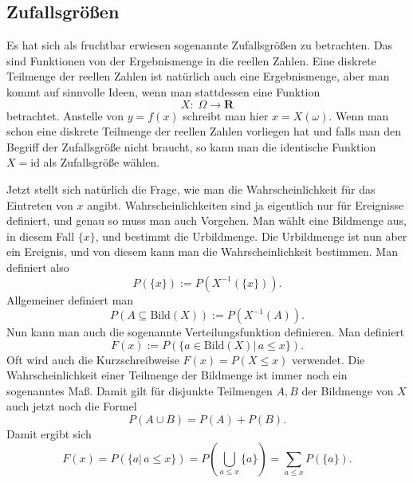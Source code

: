 \documentclass[a4paper,11pt,fleqn,twocolumn,twoside]{scrartcl}
\numberwithin{equation}{section}
\begin{document}
\subsection{Zufallsgrößen}

Es hat sich als fruchtbar erwiesen sogenannte Zufallsgrößen zu
betrachten. Das sind Funktionen von der Ergebnismenge in die reellen
Zahlen. Eine diskrete Teilmenge der reellen Zahlen ist natürlich auch
eine Ergebnismenge, aber man kommt auf sinnvolle Ideen, wenn man
stattdessen eine Funktion
\begin{equation}
X{:}\;\Omega\rightarrow\mathbf R
\end{equation}
betrachtet. Anstelle von $y=f(x)$ schreibt man hier $x=X(\omega)$.
Wenn man schon eine diskrete Teilmenge der reellen Zahlen vorliegen
hat und falls man den Begriff der Zufallsgröße nicht braucht, so kann
man die identische Funktion $X=\mathrm{id}$ als Zufallsgröße wählen.

Jetzt stellt sich natürlich die Frage, wie man die
Wahrscheinlichkeit für das Eintreten von $x$ angibt.
Wahrscheinlichkeiten sind ja eigentlich nur für Ereignisse definiert,
und genau so muss man auch Vorgehen. Man wählt eine Bildmenge aus,
in diesem Fall $\{x\}$, und bestimmt die Urbildmenge.
Die Urbildmenge ist nun aber ein Ereignis, und von diesem kann man
die Wahrscheinlichkeit bestimmen. Man definiert also
\begin{equation}
P(\{x\}) := P(X^{-1}(\{x\})).
\end{equation}
Allgemeiner definiert man
\begin{equation}
P(A\subseteq \mathrm{Bild}(X)) := P(X^{-1}(A)).
\end{equation}
Nun kann man auch die sogenannte Verteilungsfunktion definieren.
Man definiert
\begin{equation}
F(x) := P(\{a{\in}\mathrm{Bild}(X)|\,a\le x\}).
\end{equation}
Oft wird auch die Kurzschreibweise $F(x)=P(X\le x)$ verwendet.
Die Wahrscheinlichkeit einer Teilmenge der Bildmenge ist immer noch
ein sogenanntes Maß. Damit gilt für disjunkte Teilmengen $A,B$
der Bildmenge von $X$ auch jetzt noch die Formel
\begin{equation}
P(A\cup B) = P(A)+P(B).
\end{equation}
Damit ergibt sich
\[F(x) = P(\{a|\,a\le x\})
= P(\bigcup_{a\le x}\{a\}) = \sum_{a\le x} P(\{a\}).\]
\end{document}

